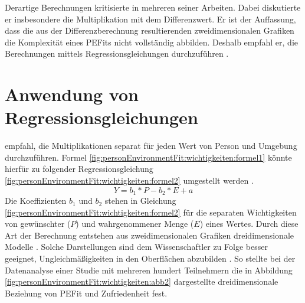 Derartige Berechnungen kritisierte \textcite[S. 51ff.]{edwards:1991}\cite[S. 9ff.]{edwards:1990}\cite[S. 2ff.]{edwards:1993}\cite[S. 2ff.]{edwards:1993b} in mehreren seiner Arbeiten. Dabei diskutierte er insbesondere die Multiplikation mit dem Differenzwert. Er ist der Auffassung, dass die aus der Differenzberechnung resultierenden zweidimensionalen Grafiken die Komplexität eines \acp{PEFit} nicht vollständig abbilden. Deshalb empfahl er, die Berechnungen mittels Regressionsgleichungen durchzuführen \cite[S. 51ff.]{edwards:1991}\cite[S. 9ff.]{edwards:1990}\cite[S. 2ff.]{edwards:1993}\cite[S. 1ff.]{edwards:1993b}.

\section{Anwendung von Regressionsgleichungen}
\label{ch:personEnvironmentFit:regressionsgleichungen}
\textcite[S. 51ff.]{edwards:1991}\cite[S. 9ff.]{edwards:1990}\cite[S. 2ff.]{edwards:1993}\cite[S. 2ff.]{edwards:1993b} empfahl, die Multiplikationen separat für jeden Wert von Person und Umgebung durchzuführen. Formel \ref{fig:personEnvironmentFit:wichtigkeiten:formel1} könnte hierfür zu folgender Regressionsgleichung \ref{fig:personEnvironmentFit:wichtigkeiten:formel2} umgestellt werden \cite[S. 9f.]{edwards:1990}\cite[S. 2f.]{edwards:1993b}.
\begin{equation}
	Y = b_1 * P - b_2 * E + a
	\label{fig:personEnvironmentFit:wichtigkeiten:formel2}
\end{equation}
Die Koeffizienten $b_1$ und $b_2$ stehen in Gleichung \ref{fig:personEnvironmentFit:wichtigkeiten:formel2} für die separaten Wichtigkeiten von gewünschter ($P$) und wahrgenommener Menge ($E$) eines Wertes. Durch diese Art der Berechnung entstehen aus zweidimensionalen Grafiken dreidimensionale Modelle \cite[S. 2]{edwards:1993}. Solche Darstellungen sind dem Wissenschaftler zu Folge besser geeignet, Ungleichmäßigkeiten in den Oberflächen abzubilden \cite[S. 51ff.]{edwards:1991}. So stellte \textcite[S. 53ff.]{edwards:1991} bei der Datenanalyse einer Studie mit mehreren hundert Teilnehmern die in Abbildung \ref{fig:personEnvironmentFit:wichtigkeiten:abb2} dargestellte dreidimensionale Beziehung von \ac{PEFit} und Zufriedenheit fest.

